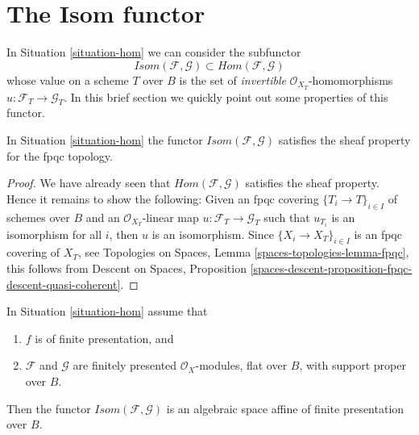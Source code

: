 \section{The Isom functor}
\label{section-isom}

\noindent
In Situation \ref{situation-hom} we can consider the subfunctor
$$
\mathit{Isom}(\mathcal{F}, \mathcal{G}) \subset
\mathit{Hom}(\mathcal{F}, \mathcal{G})
$$
whose value on a scheme $T$ over $B$ is the set of {\it invertible}
$\mathcal{O}_{X_T}$-homomorphisms $u : \mathcal{F}_T \to \mathcal{G}_T$.
In this brief section we quickly point out some properties of this
functor.

\begin{lemma}
\label{lemma-isom-sheaf}
In Situation \ref{situation-hom} the functor
$\mathit{Isom}(\mathcal{F}, \mathcal{G})$ 
satisfies the sheaf property for the fpqc topology.
\end{lemma}

\begin{proof}
We have already seen that $\mathit{Hom}(\mathcal{F}, \mathcal{G})$
satisfies the sheaf property. Hence it remains to show the following:
Given an fpqc covering $\{T_i \to T\}_{i \in I}$ of schemes over $B$
and an $\mathcal{O}_{X_T}$-linear map
$u : \mathcal{F}_T \to \mathcal{G}_T$ such that
$u_{T_i}$ is an isomorphism for all $i$, then $u$ is an isomorphism.
Since $\{X_i \to X_T\}_{i \in I}$ is an fpqc covering of $X_T$, see
Topologies on Spaces, Lemma \ref{spaces-topologies-lemma-fpqc},
this follows from
Descent on Spaces, Proposition
\ref{spaces-descent-proposition-fpqc-descent-quasi-coherent}.
\end{proof}

\begin{proposition}
\label{proposition-isom}
In Situation \ref{situation-hom} assume that
\begin{enumerate}
\item $f$ is of finite presentation, and
\item $\mathcal{F}$ and $\mathcal{G}$ are finitely presented
$\mathcal{O}_X$-modules, flat over $B$, with support proper over $B$.
\end{enumerate}
Then the functor $\mathit{Isom}(\mathcal{F}, \mathcal{G})$ is
an algebraic space affine of finite presentation over $B$.
\end{proposition}

